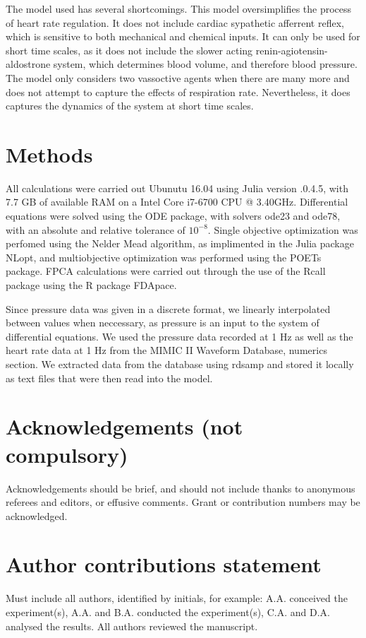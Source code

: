 \documentclass[fleqn,10pt]{wlscirep}
\begin{document}
The model used has several shortcomings. This model oversimplifies the process of heart rate regulation. It does not include cardiac sypathetic afferrent reflex, which is sensitive to both mechanical and chemical inputs. \cite{du2007love} It can only be used for short time scales, as it does not include the slower acting renin-agiotensin-aldostrone system, which determines blood volume, and therefore blood pressure. \cite{boron2016medical} The model only considers two vassoctive agents when there are many more and does not attempt to capture the effects of respiration rate.  Nevertheless, it does captures the dynamics of the system at short time scales.
\section*{Methods}
All calculations were carried out Ubunutu 16.04 using Julia version .0.4.5, with 7.7 GB of available RAM on a Intel Core i7-6700 CPU @ 3.40GHz. Differential equations were solved using the ODE package, with solvers ode23 and ode78, with an absolute and relative tolerance of $10^{-8}$. Single objective optimization was perfomed using the Nelder Mead algorithm, as implimented in the Julia package NLopt, and multiobjective optimization was performed using the POETs package. FPCA calculations were carried out through the use of the Rcall package using the R package FDApace. 

Since pressure data was given in a discrete format, we linearly interpolated between values when neccessary, as pressure is an input to the system of differential equations. We used the pressure data recorded at 1 Hz as well as the heart rate data at 1 Hz from the MIMIC II Waveform Database, numerics section. We extracted data from the database using rdsamp and stored it locally as text files that were then read into the model.

\section*{Acknowledgements (not compulsory)}
Acknowledgements should be brief, and should not include thanks to anonymous referees and editors, or effusive comments. Grant or contribution numbers may be acknowledged.
\section*{Author contributions statement}
Must include all authors, identified by initials, for example:
A.A. conceived the experiment(s),  A.A. and B.A. conducted the experiment(s), C.A. and D.A. analysed the results.  All authors reviewed the manuscript. 
\end{document}

